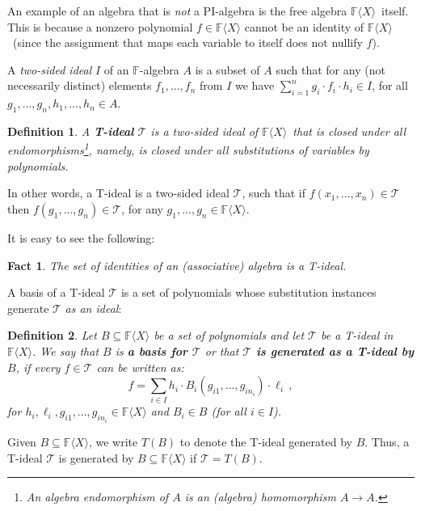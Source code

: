\documentclass[12pt,reqno]{article}
\newtheorem{definition}{Definition}
\newtheorem{fact}[theorem]{Fact}
\newcommand\F{\ensuremath{\mathbb F}}
\newcommand{\cd}{\cdot}
\newcommand{\freea}{\ensuremath{\F\langle X\rangle}}
\begin{document}
An example of an algebra that is \textit{not} a PI-algebra is the free algebra \freea\ itself. This is because a nonzero polynomial $f\in\freea $ cannot be an identity of \freea\ (since the assignment that maps each variable to itself does not nullify $f$).

A \emph{two-sided ideal} $I$ of an \F-algebra $A$ is a subset of $A$ such that for any (not necessarily distinct) elements $f_1,...,f_n$ from $I$ we have $\sum_{i=1}^n g_i\cd f_i \cd h_i \in I$, for all $g_1,...,g_n, h_1,...,h_n\in A$.

\begin{definition}\label{def:T-ideal} A \textbf{T-ideal} $\mathcal T$ is a two-sided ideal of \freea\ that is closed under all endomorphisms\footnote{An algebra endomorphism of $A$ is an (algebra)
homomorphism $A\to A$.}, namely, is closed under all substitutions of variables by polynomials.
\end{definition}
In other words, a T-ideal is a two-sided ideal $\mathcal T$, such that if $f(x_1,...,x_n)\in \mathcal T$ then $f(g_1,...,g_n)\in \mathcal T$, for any $g_1,...,g_n\in \freea$.

It is easy to see the following:
\begin{fact} \label{fac:identities-are-T-ideal}
The set of identities of an (associative) algebra is a T-ideal.
\end{fact}

A basis of a T-ideal $\mathcal T$ is a set of polynomials whose substitution instances generate $\mathcal T$ \textit{as an ideal}: %
\begin{definition}%
Let $B\subseteq \freea$ be a set of polynomials and let $\mathcal T$ be a T-ideal in \freea. We say that $B$ is \textbf{a basis for $\mathcal T$} or that \textbf{$\mathcal  T$ is generated as a T-ideal by $B$}, if every $f\in \mathcal T$ can be written as:
\[
f=\sum_{i\in I} h_i\cd B_i(g_{i1},...,g_{in_i})\cd \ell_i\,,
\]
for $h_i,\ell_i,g_{i1},...,g_{in_i}\in\freea$ and $B_i\in B$ (for all $i\in I$).
\end{definition}
Given $B\subseteq \freea$, we write $T(B)$ to denote the T-ideal generated by $B$. Thus, a T-ideal $\mathcal T$ is generated by $B \subseteq \freea$ if $\mathcal T = T(B)$.
\end{document}
